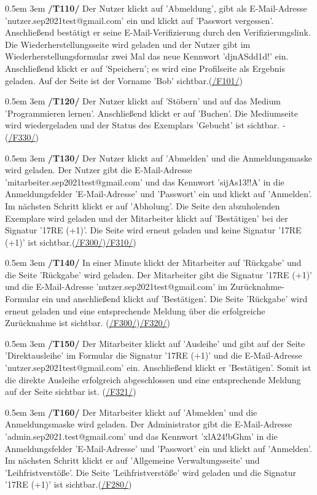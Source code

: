 \documentclass{article}
\newcommand{\specification}[3]{
	{\parindent 0.5em \hangindent 3em \hypertarget{spec:#1:#2}{\textbf{/#1#2/}} #3 \par \nobreak \vspace*{0.5em}}
}
\begin{document}
\specification{T}{110}{Der Nutzer klickt auf 'Abmeldung', gibt als E-Mail-Adresse \linebreak  'nutzer.sep2021test@gmail.com' ein und klickt auf 'Passwort vergessen'. Anschließend \linebreak  bestätigt er seine E-Mail-Verifizierung durch den Verifizierungslink. Die Wiederherstellungsseite wird geladen und der Nutzer gibt im Wiederherstellungsformular zwei Mal das neue Kennwort 'djnASdd1d!' ein. Anschließend klickt er auf 'Speichern'; es wird eine Profilseite als Ergebnis geladen. Auf der Seite ist der Vorname 'Bob' sichtbar.­(\hyperlink{spec:F:101}{/F101/})}
\specification{T}{120}{Der Nutzer klickt auf 'Stöbern' und auf das Medium 'Programmieren lernen'. Anschließend klickt er auf 'Buchen'. Die Mediumseite wird wiedergeladen und der Status des Exemplars 'Gebucht' ist sichtbar. ­­ (\hyperlink{spec:F:330}{/F330/})}
\specification{T}{130}{Der Nutzer klickt auf 'Abmelden' und die Anmeldungsmaske wird geladen. Der Nutzer gibt die E-Mail-Adresse 'mitarbeiter.sep2021test@gmail.com' und das Kennwort 'sijAs13!!A' in die Anmeldungsfelder 'E-Mail-Adresse' und 'Passwort' ein und klickt auf 'Anmelden'. Im nächsten Schritt klickt er auf 'Abholung'. Die Seite den abzuholenden Exemplare wird geladen und der Mitarbeiter klickt auf 'Bestätigen' bei der Signatur '17RE (+1)'. Die Seite wird erneut geladen und keine Signatur '17RE (+1)' ist sichtbar.(\hyperlink{spec:F:300}{/F300/})\hyperlink{spec:F:310}{/F310/}) }
\specification{T}{140}{In einer Minute klickt der Mitarbeiter auf 'Rückgabe' und die Seite 'Rückgabe' wird geladen. Der Mitarbeiter gibt die Signatur '17RE (+1)' und die E-Mail-Adresse \linebreak 'nutzer.sep2021test@gmail.com' im Zurücknahme-Formular ein und anschließend klickt auf \linebreak  'Bestätigen'. Die Seite 'Rückgabe' wird erneut geladen und eine entsprechende Meldung über die erfolgreiche Zurücknahme ist sichtbar. (\hyperlink{spec:F:300}{/F300/})\hyperlink{spec:F:320}{/F320/}) }
\specification{T}{150}{Der Mitarbeiter klickt auf 'Ausleihe' und gibt auf der Seite 'Direktausleihe' im Formular die Signatur '17RE (+1)' und die E-Mail-Adresse 'nutzer.sep2021test@gmail.com' ein. Anschließend klickt er 'Bestätigen'. Somit ist die direkte Ausleihe erfolgreich abgeschlossen und eine entsprechende Meldung auf der Seite sichtbar ist. (\hyperlink{spec:F:321}{/F321/})}
\specification{T}{160}{Der Mitarbeiter klickt auf 'Abmelden' und die Anmeldungsmaske wird geladen. Der Administrator gibt die E-Mail-Adresse 'admin.sep2021.test@gmail.com' und das Kennwort 'xlA24!bGhm' in die Anmeldungsfelder 'E-Mail-Adresse' und 'Passwort' ein und klickt auf 'Anmelden'. Im nächsten Schritt klickt er auf 'Allgemeine Verwaltungsseite' und 'Leihfristverstöße'. Die Seite 'Leihfristverstöße' wird geladen und die Signatur '17RE (+1)' ist sichtbar.(\hyperlink{spec:F:280}{/F280/})}
\end{document}
